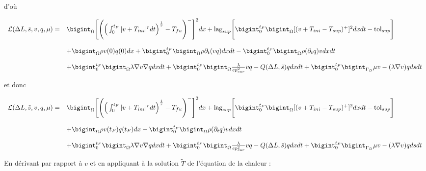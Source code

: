 \documentclass[11pt,a4paper]{article}
\begin{document}
d'où 

\begin{equation}
\begin{array}{ll}
\mathcal{L}(\Delta L,\tilde{s},v,q,\mu)= & \bigint_{\Omega}\Bigg[\Bigg(\Big(\int_{0}^{t_F}|v+T_{ini}|^rdt\Big)^{\frac{1}{r}}-T_{fu}\Bigg)^-\Bigg]^2dx +\textrm{lag}_{sup} \Bigg[\bigint_{0}^{t_F}\bigint_{\Omega}[(v+T_{ini}-T_{sup})^+]^2dxdt-\textrm{tol}_{sup}\Bigg] \\
\\
\, & +\bigint_{\Omega}\rho v(0)q(0) dx+ \bigint_{0}^{t_F}\bigint_{\Omega}\rho\partial_t (vq)dxdt-\bigint_{0}^{t_F}\bigint_{\Omega}\rho(\partial_t q)vdxdt\\
\\
\, &+\bigint_{0}^{t_F}\bigint_{\Omega}\lambda\nabla v\nabla qdxdt +\bigint_{0}^{t_F}\bigint_{\Omega}\frac{\lambda}{ep_{car}^2} vq-Q(\Delta L,\tilde{s})q dxdt +\bigint_{0}^{t_F}\bigint_{\Gamma_D}\mu v -(\lambda\nabla v)qdsdt\\
\end{array}
\end{equation}

et donc 

\begin{equation}
\begin{array}{ll}
\mathcal{L}(\Delta L,\tilde{s},v,q,\mu)= & \bigint_{\Omega}\Bigg[\Bigg(\Big(\int_{0}^{t_F}|v+T_{ini}|^rdt\Big)^{\frac{1}{r}}-T_{fu}\Bigg)^-\Bigg]^2dx +\textrm{lag}_{sup} \Bigg[\bigint_{0}^{t_F}\bigint_{\Omega}[(v+T_{ini}-T_{sup})^+]^2dxdt-\textrm{tol}_{sup}\Bigg] \\
\\
\, & +\bigint_{\Omega}\rho v(t_F)q(t_F) dx-\bigint_{0}^{t_F}\bigint_{\Omega}\rho(\partial_t q)vdxdt\\
\\
\, &+\bigint_{0}^{t_F}\bigint_{\Omega}\lambda\nabla v\nabla qdxdt +\bigint_{0}^{t_F}\bigint_{\Omega}\frac{\lambda}{ep_{car}^2} vq-Q(\Delta L,\tilde{s})q dxdt +\bigint_{0}^{t_F}\bigint_{\Gamma_D}\mu v -(\lambda\nabla v)qdsdt\\
\end{array}
\end{equation}

En dérivant par rapport à $v$ et en appliquant à la solution $\tilde{T}$ de l'équation de la chaleur :
\end{document}
